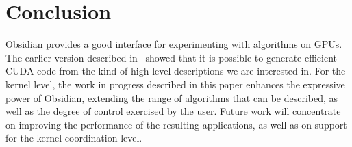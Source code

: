 
\section{Conclusion} \label{sec:conc}

Obsidian provides a good interface for experimenting with algorithms on GPUs. 
The earlier version described in~\cite{JMT} showed that it is possible to 
generate efficient CUDA code from the kind of high level descriptions we are 
interested in. For the kernel level, the work in progress described in this paper enhances the  expressive power of Obsidian, extending the range of algorithms that can be described, as well as the degree of control exercised by the user. 
Future work will concentrate on improving the performance of the resulting 
applications, as well as on support for the kernel coordination level.
